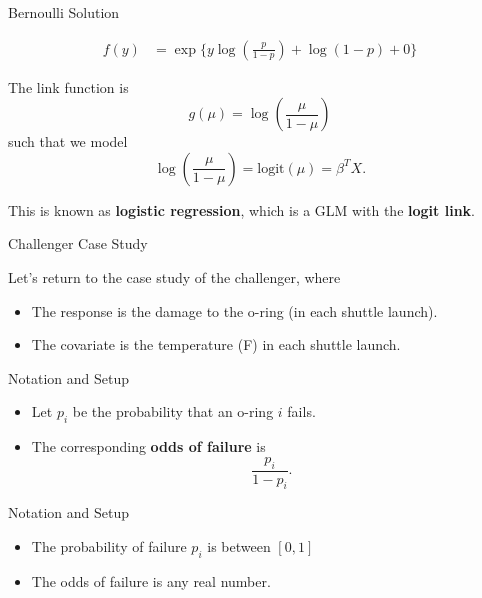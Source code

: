 \documentclass[
  ignorenonframetext,
]{beamer}
\begin{document}
\begin{frame}{Bernoulli Solution}
\protect\hypertarget{bernoulli-solution-2}{}

\begin{align}
f(y) &= \exp\{
y \log ({\frac{p}{1-p}}) + \log(1-p) + 0
\} 
\end{align}

The link function is \[g(\mu) = \log(\frac{\mu}{1-\mu})\] such that we
model \[\log(\frac{\mu}{1-\mu}) = \text{logit}(\mu)= \beta^TX.\]

This is known as \textbf{logistic regression}, which is a GLM with the
\textbf{logit link}.

\end{frame}

\begin{frame}{Challenger Case Study}
\protect\hypertarget{challenger-case-study}{}

Let's return to the case study of the challenger, where

\begin{itemize}
\item
  The response is the damage to the o-ring (in each shuttle launch).
\item
  The covariate is the temperature (F) in each shuttle launch.
\end{itemize}

\end{frame}

\begin{frame}{Notation and Setup}
\protect\hypertarget{notation-and-setup}{}

\begin{itemize}
\item
  Let \(p_i\) be the probability that an o-ring \(i\) fails.
\item
  The corresponding \textbf{odds of failure} is \[\frac{p_i}{1-p_i}.\]
\end{itemize}

\end{frame}

\begin{frame}{Notation and Setup}
\protect\hypertarget{notation-and-setup-1}{}

\begin{itemize}
\item
  The probability of failure \(p_i\) is between \([0,1]\)
\item
  The odds of failure is any real number.
\end{itemize}

\end{frame}
\end{document}
